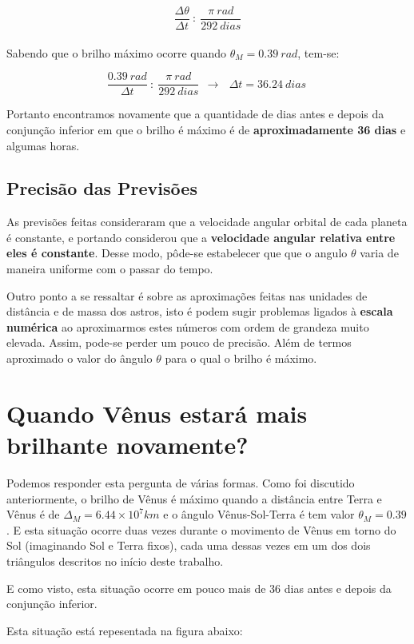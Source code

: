 \documentclass[a4paper, 12pt]{article}
\begin{document}
$$\frac{\Delta \theta }{\Delta t}\ :\ \frac{\pi \ rad }{292\ dias}$$\\

Sabendo que o brilho máximo ocorre quando $\theta_M=0.39\ rad$, tem-se:

$$\frac{0.39\ rad}{\Delta t}\ :\ \frac{\pi \ rad}{292\ dias}\ \ \longrightarrow \ \ \boxed{\ \Delta t=36.24\ dias\ }$$

Portanto encontramos novamente que a quantidade de dias antes e depois da conjunção inferior em que o brilho é máximo é de \textbf{aproximadamente 36 dias} e algumas horas.

\subsection{Precisão das Previsões}

As previsões feitas consideraram que a velocidade angular orbital de cada planeta é constante, e portando considerou que a \textbf{velocidade angular relativa entre eles é constante}. Desse modo, pôde-se estabelecer que que o angulo $\theta$ varia de maneira uniforme com o passar do tempo.

Outro ponto a se ressaltar é sobre as aproximações feitas nas unidades de distância e de massa dos astros, isto é podem sugir problemas ligados à \textbf{escala numérica} ao aproximarmos estes números com ordem de grandeza muito elevada. Assim, pode-se perder um pouco de precisão. Além de termos aproximado o valor do ângulo $\theta$ para o qual o brilho é máximo.


\section{Quando Vênus estará mais brilhante novamente?}

Podemos responder esta pergunta de várias formas. Como foi discutido anteriormente, o brilho de Vênus é máximo quando a distância entre Terra e Vênus é de $\Delta _M=6.44\times 10^7km$ e o ângulo Vênus-Sol-Terra é tem valor $\theta_M =0.39$. E esta situação ocorre duas vezes durante o movimento de Vênus em torno do Sol (imaginando Sol e Terra fixos), cada uma dessas vezes em um dos dois triângulos descritos no início deste trabalho.

E como visto, esta situação ocorre em pouco mais de 36 dias antes e depois da conjunção inferior.

Esta situação está repesentada na figura abaixo:
\end{document}
